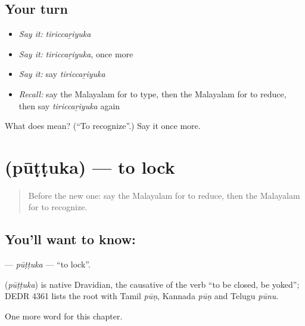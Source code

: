 \subsection*{Your turn}
\begin{itemize}
\raggedright
  \item \emph{Say it:} \emph{tiriccaṟiyuka}
  \item \emph{Say it:} \emph{tiriccaṟiyuka}, once more
  \item \emph{Say it:} say \emph{tiriccaṟiyuka}
  \item \emph{Recall:} say the Malayalam for to type, then the Malayalam for to reduce, then say \emph{tiriccaṟiyuka} again
\end{itemize}

\begin{tcolorbox}[breakable,colback=teal!4,colframe=teal!35!black,title={Before you move on}]
What does  mean? (\textquotedblleft{}To recognize\textquotedblright{}.) Say it once more.
\end{tcolorbox}
\section[\texorpdfstring{\ml{പൂട്ടുക} (pūṭṭuka)}{പൂട്ടുക (pūṭṭuka)}]{ (pūṭṭuka) — to lock}

\label{lesson:ML-C309-puttuka}



\begin{quote}
Before the new one: say the Malayalam for to reduce, then the Malayalam for to recognize.
\end{quote}

\subsection*{You'll want to know: }
\textbf{} — \emph{pūṭṭuka} — \textquotedblleft{}to lock\textquotedblright{}.

\begin{cousinweb}
\textbf{} (\emph{pūṭṭuka}) is native Dravidian, the causative of the verb \textquotedblleft{}to be closed, be yoked\textquotedblright{}; DEDR 4361 lists the root with Tamil \emph{pūṇ}, Kannada \emph{pūṇ} and Telugu \emph{pūnu}.
\end{cousinweb}

\begin{grammarlens}[title={What you've built}]
One more word for this chapter.
\end{grammarlens}

